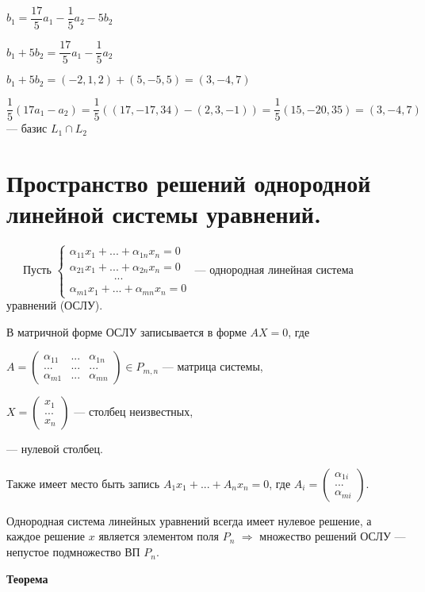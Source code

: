 \documentclass[a4paper, 12pt]{report}
\begin{document}
	$b_1 = \dfrac{17}{5}a_1 - \dfrac{1}{5}a_2 - 5 b_2$
	
	$b_1 + 5 b_2 = \dfrac{17}{5}a_1 - \dfrac{1}{5}a_2 $
	
	$b_1 + 5 b_2 =(-2, 1, 2) + (5,-5,5)=(3,-4,7)$
	
	$\dfrac{1}{5}(17a_1 - a_2) = \dfrac{1}{5}((17,-17,34) - (2,3,-1)) = \dfrac{1}{5}(15,-20,35) = (3,-4,7)$ --- базис $L_1\cap L_2$
	
	\section{Пространство решений однородной линейной системы уравнений.}
	$\quad \; \ $Пусть
	$\begin{cases}
		\alpha_{11}x_1+...+\alpha_{1n}x_n=0 \\
		\alpha_{21}x_1+...+\alpha_{2n}x_n=0 \\
		\qquad\qquad...\\
		\alpha_{m1}x_1+...+\alpha_{mn}x_n=0
	\end{cases}$ --- однородная линейная система уравнений (ОСЛУ).
	\par\bigskip
	В матричной форме ОСЛУ записывается в форме $AX = 0$, где
	\par\bigskip
	$A = \begin{pmatrix} \alpha_{11} & ... & \alpha_{1n} \\ ... & ... & ...\\ \alpha_{m1} & ... & \alpha_{mn} \end{pmatrix} \in P_{m,n}$ --- матрица системы, 
	\par\bigskip
	$X = \begin{pmatrix} x_1 \\ ...\\ x_n \end{pmatrix}$ --- столбец неизвестных,
	\par{} --- нулевой столбец.
	
	Также имеет место быть запись $A_1 x_1 + ... + A_n x_n = 0$, где $A_i = \begin{pmatrix} \alpha_{1i} \\ ...\\ \alpha_{mi}\end{pmatrix}$.
	
	Однородная система линейных уравнений всегда имеет нулевое решение, а каждое решение $x$ является элементом поля $P_n$ $\Rightarrow$ множество решений ОСЛУ  --- непустое подмножество ВП $P_n$.
	\par\bigskip
	\textbf{Теорема}
	
\end{document}

